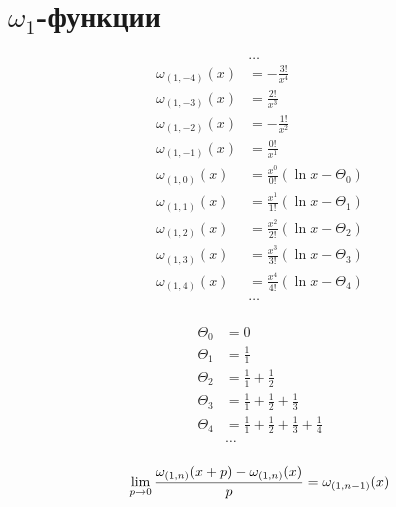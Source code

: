 
\section{$\omega_1$-функции}

\begin{equation*} \begin{aligned}
&\ldots \\
\omega_{(1, -4)}(x) &=
- \frac{3!}{x^4} \\
\omega_{(1, -3)}(x) &=
  \frac{2!}{x^3} \\
\omega_{(1, -2)}(x) &=
- \frac{1!}{x^2} \\
\omega_{(1, -1)}(x) &=
  \frac{0!}{x^1} \\
\omega_{(1, 0)}(x) &= 
  \frac{x^0}{0!} \left(
  \ln{x} - \Theta_0 \right) \\
\omega_{(1, 1)}(x) &= 
  \frac{x^1}{1!} \left(
  \ln{x} - \Theta_1 \right) \\
\omega_{(1, 2)}(x) &= 
  \frac{x^2}{2!} \left(
  \ln{x} - \Theta_2 \right) \\
\omega_{(1, 3)}(x) &= 
  \frac{x^3}{3!} \left(
  \ln{x} - \Theta_3 \right) \\
\omega_{(1, 4)}(x) &= 
  \frac{x^4}{4!} \left(
  \ln{x} - \Theta_4 \right) \\
&\ldots \\
\end{aligned} \end{equation*}

\begin{equation*} \begin{aligned}
\Theta_0 &= 0 \\
\Theta_1 &= 
  \frac{1}{1} \\
\Theta_2 &= 
  \frac{1}{1} 
+ \frac{1}{2} \\
\Theta_3 &= 
  \frac{1}{1} 
+ \frac{1}{2} 
+ \frac{1}{3} \\
\Theta_4 &= 
  \frac{1}{1} 
+ \frac{1}{2} 
+ \frac{1}{3} 
+ \frac{1}{4} \\
&\ldots \\
\end{aligned} \end{equation*}

\begin{equation*}
\lim_{p \to 0} \frac{\omega_{(1, n)}(x + p) - \omega_{(1, n)}(x)}{p} = \omega_{(1, n - 1)}(x) \\
\end{equation*}
